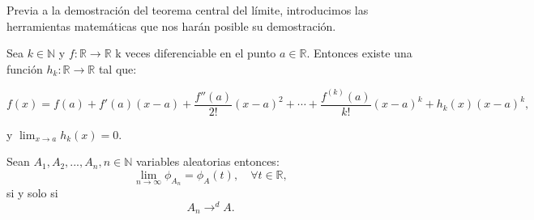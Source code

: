 \documentclass[../proyecto.tex]{memoir}
\begin{document}
Previa a la demostración del teorema central del límite, introducimos las herramientas matemáticas que nos harán posible su demostración.

\begin{teorema}

Sea $k \in \mathds{N}$ y $f: \mathds{R} \to \mathds{R}$ k veces diferenciable en el punto $a \in \mathds{R}$. Entonces existe una función $h_k: \mathds{R} \to \mathds{R}$ tal que:

$$
f(x)=f(a)+f'(a)(x-a)+\frac{f''(a)}{2!}(x-a)^2+\dotsb+\frac{f^{(k)}(a)}{k!}(x-a)^k + h_k(x)(x-a)^k,
$$

y $\lim_{x\to a} h_k(x) = 0$.
\end{teorema}

\begin{teorema} \label{cont}
Sean $A_1, A_2,...,A_n, n\in\mathds{N}$ variables aleatorias entonces: $$
\lim_{n \to \infty }{\phi_{A_n}} = \phi_{A}(t), \quad \forall t\in \mathds{R},
$$
si y solo si $$
A_n \to^d A.
$$

\end{teorema}
\end{document}
